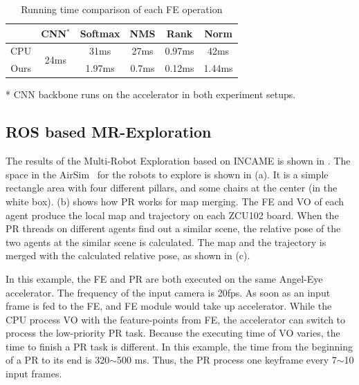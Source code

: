 \begin{table}[t]
  \centering
  \caption{Running time comparison of each FE operation}
    \begin{threeparttable}
\begin{tabular}{|c|c|c|c|c|c|}
  \hline
             &CNN$^*$ &    Softmax &        NMS &       Rank &  Norm \\
  \hline
         CPU & \multirow{2}{*}{24ms} &      31ms &       27ms &       0.97ms &       42ms \\
  \cline{1-1} \cline{3-6}
    Ours & \multirow{2}{*}{} &    1.97ms &      0.7ms &     0.12ms &     1.44ms \\
  \hline
  \end{tabular} 
  
\begin{tablenotes}
    \footnotesize
   \item[*] CNN backbone runs on the accelerator in both experiment setups.  
\end{tablenotes}
    \end{threeparttable}
  
  \label{tab:optimization}%
\end{table}%


\subsection{ ROS based MR-Exploration }

The results of the Multi-Robot Exploration based on INCAME is shown in . The space in the AirSim~\cite{shah2018airsim} for the robots to explore is shown in (a). It is a simple rectangle area with four different pillars, and some chairs at the center (in the white box).  (b) shows how PR works for map merging. The FE and VO of each agent produce the local map and trajectory on each ZCU102 board. When the PR threads on different agents find out a similar scene, the relative pose of the two agents at the similar scene is calculated. The map and the trajectory is merged with the calculated relative pose, as shown in (c).

In this example, the FE and PR are both executed on the same Angel-Eye accelerator. The frequency of the input camera is 20fps. As soon as an input frame is fed to the FE, and FE module would take up accelerator. While the CPU process VO with the feature-points from FE, the accelerator can switch to process the low-priority PR task. Because the executing time of VO varies, the time to finish a PR task is different. In this example, the time from the beginning of a PR to its end is 320$\sim$500 ms. Thus, the PR process one keyframe every 7$\sim$10 input frames.